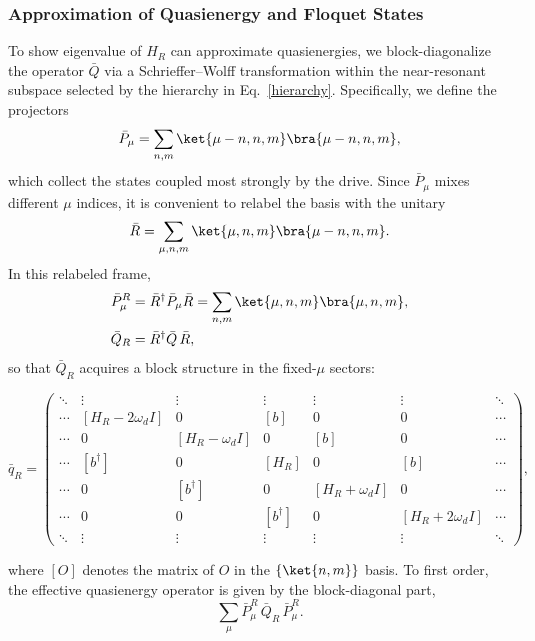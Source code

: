 \subsubsection{Approximation of Quasienergy and Floquet States}
To show eigenvalue of $H_R$ can approximate quasienergies, we block-diagonalize the operator $\bar Q$  via a Schrieffer--Wolff transformation within the near-resonant subspace selected by the hierarchy in Eq.~\eqref{hierarchy}. Specifically, we define the projectors
\begin{equation}
    \bar P_\mu=\sum_{n,m}\ket{\mu-n,n,m}\bra{\mu-n,n,m},
\end{equation}
which collect the states coupled most strongly by the drive. Since $\bar P_\mu$ mixes different $\mu$ indices, it is convenient to relabel the basis with the unitary
\begin{equation}
    \bar R=\sum_{\mu,n,m}\ket{\mu,n,m}\bra{\mu-n,n,m}.
\end{equation}
In this relabeled frame,
\begin{align}
    \bar P_\mu^{R} &= \bar R^\dagger \bar P_\mu \bar R
    =\sum_{n,m}\ket{\mu,n,m}\bra{\mu,n,m},\\
    \bar Q_{R} &= \bar R^\dagger \bar Q\,\bar R,
\end{align}
so that $\bar Q_R$ acquires a block structure in the fixed-$\mu$ sectors:
\begin{widetext}
\begin{equation}
    \bar q_R=
    \begin{pmatrix}
     \ddots & \vdots & \vdots & \vdots & \vdots & \vdots & \ddots \\
     \cdots & [H_R-2\omega_d I] & 0 & [b] & 0 & 0 & \cdots \\
     \cdots & 0 & [H_R-\omega_d I] & 0 & [b] & 0 & \cdots \\
     \cdots & [b^\dagger] & 0 & [H_R] & 0 & [b] & \cdots \\
     \cdots & 0 & [b^\dagger] & 0 & [H_R+\omega_d I] & 0 & \cdots \\
     \cdots & 0 & 0 & [b^\dagger] & 0 & [H_R+2\omega_d I] & \cdots \\
     \ddots & \vdots & \vdots & \vdots & \vdots & \vdots & \ddots
    \end{pmatrix},
\end{equation}
\end{widetext}
where $[O]$ denotes the matrix of $O$ in the $\{\ket{n,m}\}$ basis. To first order, the effective quasienergy operator is given by the block-diagonal part,
\begin{equation}
    \sum_\mu \bar P_\mu^{R}\,\bar Q_R\,\bar P_\mu^{R}.
\end{equation}
